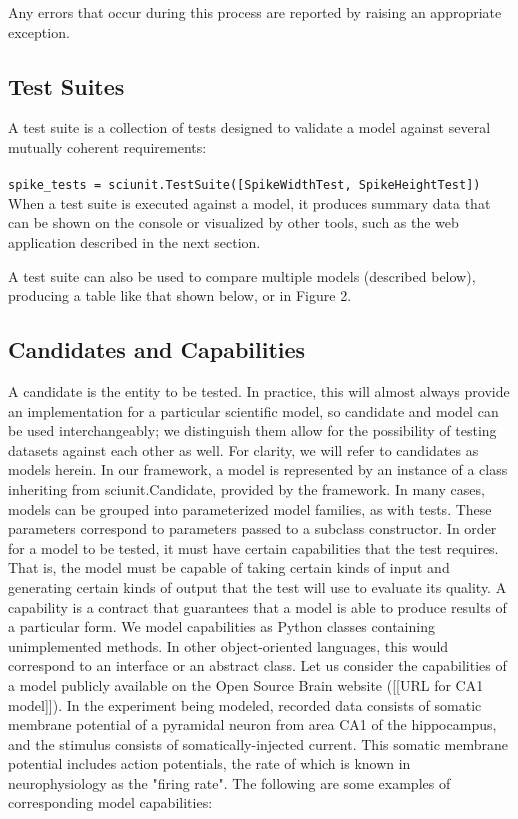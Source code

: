 \documentclass[11pt,letterpaper]{article}
\begin{document}
Any errors that occur during this process are reported by raising an appropriate exception.

\subsection{Test Suites}
A test suite is a collection of tests designed to validate a model against several mutually coherent requirements:
\\
\\
\verb|spike_tests = sciunit.TestSuite([SpikeWidthTest, SpikeHeightTest])|
\\

When a test suite is executed against a model, it produces summary data that can be shown on the console or visualized by other tools, such as the web application described in the next section.

A test suite can also be used to compare multiple models (described below), producing a table like that shown below, or in Figure 2.

\subsection{Candidates and Capabilities}
A candidate is the entity to be tested.  In practice, this will almost always provide an implementation for a particular scientific model, so candidate and model can be used interchangeably; we distinguish them allow for the possibility of testing datasets against each other as well.  For clarity, we will refer to candidates as models herein.  In our framework, a model is represented by an instance of a class inheriting from sciunit.Candidate, provided by the framework.  In many cases, models can be grouped into parameterized model families, as with tests. These parameters correspond to parameters passed to a subclass constructor.
In order for a model to be tested, it must have certain capabilities that the test requires.  That is, the model must be capable of taking certain kinds of input and generating certain kinds of output that the test will use to evaluate its quality.  A capability is a contract that guarantees that a model is able to produce results of a particular form. We model capabilities as Python classes containing unimplemented methods. In other object-oriented languages, this would correspond to an interface or an abstract class.  
Let us consider the capabilities of a model publicly available on the Open Source Brain website ([[URL for CA1 model]]).  In the experiment being modeled, recorded data consists of somatic membrane potential of a pyramidal neuron from area CA1 of the hippocampus, and the stimulus consists of somatically-injected current.  This somatic membrane potential includes action potentials, the rate of which is known in neurophysiology as the "firing rate".  The following are some examples of corresponding model capabilities:  
\end{document}
